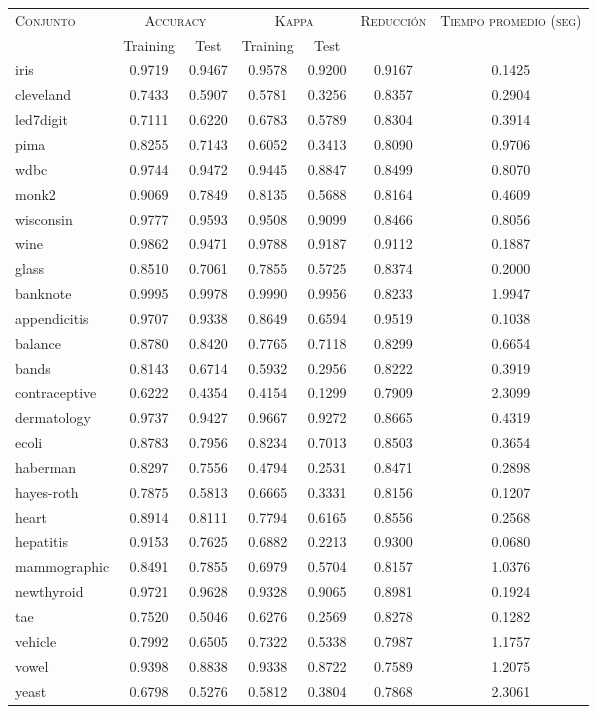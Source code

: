 \begin{table}[]
\centering
\begin{tabular}{l c c c c c c}
\hline
\multirow{2}{*}{\textsc{Conjunto}}
	& \multicolumn{2}{c}{\textsc{Accuracy}}
	& \multicolumn{2}{c}{\textsc{Kappa}}
	& \textsc{Reducción}
	& \textsc{Tiempo promedio (seg)} \\
	& Training & Test
	& Training & Test \\ 
\hline
\hline

iris & 0.9719 & 0.9467 & 0.9578 & 0.9200 & 0.9167 & 0.1425 \\
cleveland & 0.7433 & 0.5907 & 0.5781 & 0.3256 & 0.8357 & 0.2904 \\
led7digit & 0.7111 & 0.6220 & 0.6783 & 0.5789 & 0.8304 & 0.3914 \\
pima & 0.8255 & 0.7143 & 0.6052 & 0.3413 & 0.8090 & 0.9706 \\
wdbc & 0.9744 & 0.9472 & 0.9445 & 0.8847 & 0.8499 & 0.8070 \\
monk2 & 0.9069 & 0.7849 & 0.8135 & 0.5688 & 0.8164 & 0.4609 \\
wisconsin & 0.9777 & 0.9593 & 0.9508 & 0.9099 & 0.8466 & 0.8056 \\
wine & 0.9862 & 0.9471 & 0.9788 & 0.9187 & 0.9112 & 0.1887 \\
glass & 0.8510 & 0.7061 & 0.7855 & 0.5725 & 0.8374 & 0.2000 \\
banknote & 0.9995 & 0.9978 & 0.9990 & 0.9956 & 0.8233 & 1.9947 \\
appendicitis & 0.9707 & 0.9338 & 0.8649 & 0.6594 & 0.9519 & 0.1038 \\
balance & 0.8780 & 0.8420 & 0.7765 & 0.7118 & 0.8299 & 0.6654 \\
bands & 0.8143 & 0.6714 & 0.5932 & 0.2956 & 0.8222 & 0.3919 \\
contraceptive & 0.6222 & 0.4354 & 0.4154 & 0.1299 & 0.7909 & 2.3099 \\
dermatology & 0.9737 & 0.9427 & 0.9667 & 0.9272 & 0.8665 & 0.4319 \\
ecoli & 0.8783 & 0.7956 & 0.8234 & 0.7013 & 0.8503 & 0.3654 \\
haberman & 0.8297 & 0.7556 & 0.4794 & 0.2531 & 0.8471 & 0.2898 \\
hayes-roth & 0.7875 & 0.5813 & 0.6665 & 0.3331 & 0.8156 & 0.1207 \\
heart & 0.8914 & 0.8111 & 0.7794 & 0.6165 & 0.8556 & 0.2568 \\
hepatitis & 0.9153 & 0.7625 & 0.6882 & 0.2213 & 0.9300 & 0.0680 \\
mammographic & 0.8491 & 0.7855 & 0.6979 & 0.5704 & 0.8157 & 1.0376 \\
newthyroid & 0.9721 & 0.9628 & 0.9328 & 0.9065 & 0.8981 & 0.1924 \\
tae & 0.7520 & 0.5046 & 0.6276 & 0.2569 & 0.8278 & 0.1282 \\
vehicle & 0.7992 & 0.6505 & 0.7322 & 0.5338 & 0.7987 & 1.1757 \\
vowel & 0.9398 & 0.8838 & 0.9338 & 0.8722 & 0.7589 & 1.2075 \\
yeast & 0.6798 & 0.5276 & 0.5812 & 0.3804 & 0.7868 & 2.3061 \\


\end{tabular}
\end{table}
